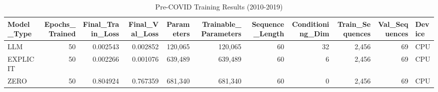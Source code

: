 \begin{table}
\caption{Pre-COVID Training Results (2010-2019)}
\label{tab:precovid_training}
\begin{tabular}{l|r|r|r|r|r|r|r|r|r|l}
\toprule
Model_Type & Epochs_Trained & Final_Train_Loss & Final_Val_Loss & Parameters & Trainable_Parameters & Sequence_Length & Conditioning_Dim & Train_Sequences & Val_Sequences & Device \\
\midrule
LLM & 50 & 0.002543 & 0.002852 & 120,065 & 120,065 & 60 & 32 & 2,456 & 69 & CPU \\
EXPLICIT & 50 & 0.002266 & 0.001076 & 639,489 & 639,489 & 60 & 6 & 2,456 & 69 & CPU \\
ZERO & 50 & 0.804924 & 0.767359 & 681,340 & 681,340 & 60 & 0 & 2,456 & 69 & CPU \\
\bottomrule
\end{tabular}
\end{table}
